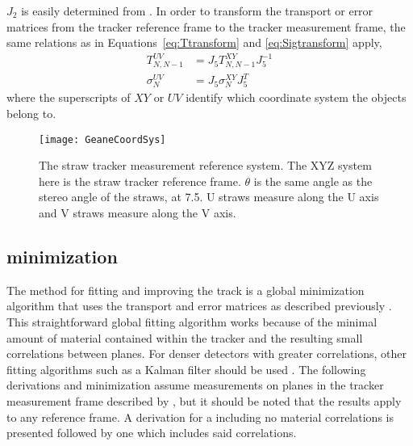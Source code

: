 $J_{2}$ is easily determined from . In order to transform the transport or error matrices from the tracker reference frame to the tracker measurement frame, the same relations as in Equations~\ref{eq:Ttransform} and \ref{eq:Sigtransform} apply,
    \begin{align}
        T_{N,N-1}^{UV} &= J_{5} T_{N,N-1}^{XY} J_{5}^{-1} \\
        \sigma_{N}^{UV} &= J_{5} \sigma_{N}^{XY} J_{5}^{T}
    \end{align}
where the superscripts of $XY$ or $UV$ identify which coordinate system the objects belong to.

\begin{figure}[]
  \centering
  \texttt{[image: GeaneCoordSys]}
    \caption[Natural tracker measurement system]{The straw tracker measurement reference system. The XYZ system here is the straw tracker reference frame. $\theta$ is the same angle as the stereo angle of the straws, at 7.5\textdegree{}. U straws measure along the U axis and V straws measure along the V axis.}
    \label{fig:GeaneCoordSys}
\end{figure}




\subsection{\texorpdfstring{\chisq}{chisq} minimization}
\label{sec:TrackFittingAlgorithm}



The method for fitting and improving the track is a global \chisq minimization algorithm that uses the transport and error matrices as described previously \cite{geanemanual,trajfit}. This straightforward global fitting algorithm works because of the minimal amount of material contained within the tracker and the resulting small correlations between planes. For denser detectors with greater correlations, other fitting algorithms such as a Kalman filter should be used \cite{Lavezzi}. The following derivations and minimization assume measurements on planes in the tracker measurement frame described by , but it should be noted that the results apply to any reference frame. A derivation for a \chisq including no material correlations is presented followed by one which includes said correlations.


